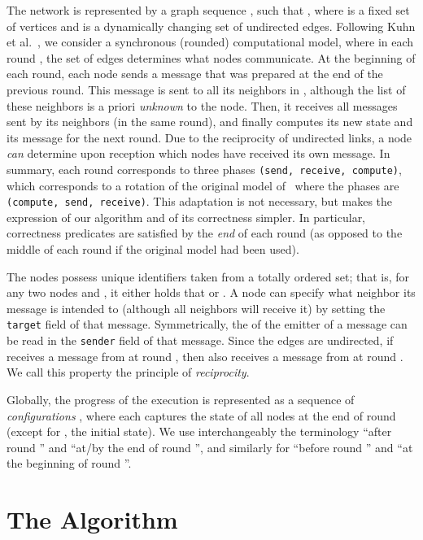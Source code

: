 \documentclass[twocolumn]{article}
\begin{document}
The network is represented by a graph sequence , such that , where  is a fixed set of vertices and  is a dynamically changing set of undirected edges. 
Following Kuhn et al.~\cite{KLO10}, we consider a synchronous (rounded) computational model, where in each round , the set of edges  determines what nodes communicate. At the beginning of each round, each node sends a message that was prepared at the end of the previous round. This message is sent to all its neighbors in , although the list of these neighbors is a priori {\em unknown} to the node. Then, it receives all messages sent by its neighbors (in the same round), and finally computes its new state and its message for the next round. Due to the reciprocity of undirected links, a node {\em can} determine upon reception which nodes have received its own message. In summary, each round corresponds to three phases {\tt (send, receive, compute)}, which corresponds to a rotation of the original model of~\cite{KLO10} where the phases are {\tt (compute, send, receive)}. This adaptation is not necessary, but makes the expression of our algorithm and of its correctness simpler. In particular, correctness predicates are satisfied by the {\em end} of each round (as opposed to the middle of each round if the original model had been used).




The nodes possess unique identifiers taken from a totally ordered set; that is, for any two nodes  and , it either holds that  or . A node can specify what neighbor its message is intended to (although all neighbors will receive it) by setting the {\tt target} field of that message. Symmetrically, the  of the emitter of a message can be read in the {\tt sender} field of that message. Since the edges are undirected, if  receives a message from  at round , then  also receives a message from  at round . We call this property the principle of \textit{reciprocity}.


Globally, the progress of the execution is represented as a sequence of {\em configurations} , where each  captures the state of all nodes at the end of round   (except for , the initial state). We use interchangeably the terminology ``after round '' and ``at/by the end of round '', and similarly for ``before round '' and ``at the beginning of round ''.


\section{The Algorithm}
\label{sec:algorithm}
\end{document}
